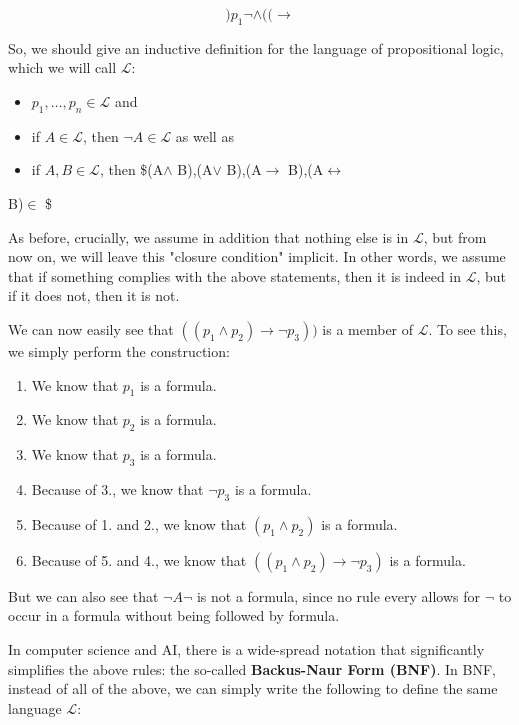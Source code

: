 \documentclass[11pt]{article}
\begin{document}
$$)p_1\neg\land((\rightarrow$$

So, we should give an inductive definition for the language of propositional logic, which we will call \(\mathcal{L}\):

\begin{itemize}
\item \(p_1,\dots, p_n \in \mathcal{L}\) and

\item if \(A\in\mathcal{L}\), then \(\neg A\in \mathcal{L}\) as well as

\item if \(A,B\in\mathcal{L}\), then \$(A\(\land\) B),(A\(\lor\) B),(A\(\rightarrow\) B),(A\(\leftrightarrow\)
\end{itemize}
B)\(\in\) \$

As before, crucially, we assume in addition that nothing else is in \(\mathcal{L}\), but from now on, we will leave this "closure condition" implicit. In other words, we assume that if something complies with the above statements, then it is indeed in \(\mathcal{L}\), but if it does not, then it is not. 

We can now easily see that \(((p_1\land p_2)\rightarrow \neg p_3))\) is a
member of \(\mathcal{L}\). To see this, we simply perform the construction:

\begin{enumerate}
\item We know that \(p_1\) is a formula.
\item We know that \(p_2\) is a formula.
\item We know that \(p_3\) is a formula.
\item Because of 3., we know that \(\neg p_3\) is a formula.
\item Because of 1. and 2., we know that \((p_1\land p_2)\) is a formula.
\item Because of 5. and 4., we know that \(((p_1\land p_2)\rightarrow \neg p_3)\) is a formula.
\end{enumerate}

But we can also see that \(\neg A\neg\) is not a formula, since no rule every
allows for \(\neg\) to occur in a formula without being followed by formula.

In computer science and AI, there is a wide-spread notation that significantly
simplifies the above rules: the so-called \textbf{\textbf{Backus-Naur Form (BNF)}}. In BNF,
instead of all of the above, we can simply write the following to define the same language \(\mathcal{L}\):
\end{document}

